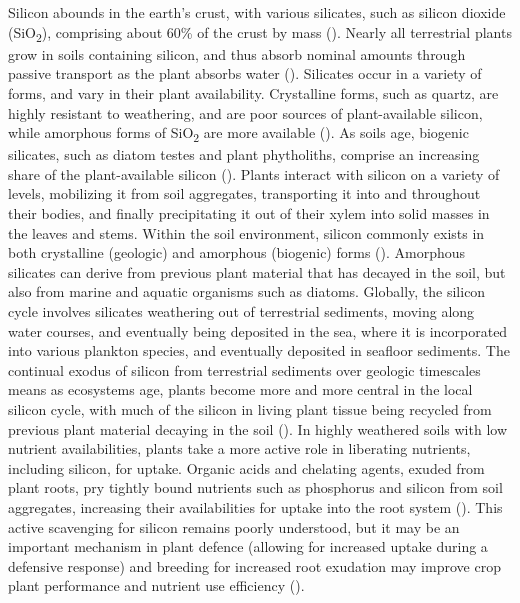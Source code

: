 \documentclass[12pt, letterpaper, ]{report}
\begin{document}
Silicon abounds in the earth’s crust, with various silicates, such as silicon dioxide (SiO\textsubscript{2}), comprising about 60\% of the crust by mass (\cite{holland_41_2014}). Nearly all terrestrial plants grow in soils containing silicon, and thus absorb nominal amounts through passive transport as the plant absorbs water (\cite{debona_silicons_2017}). Silicates occur in a variety of forms, and vary in their plant availability. Crystalline forms, such as quartz, are highly resistant to weathering, and are poor sources of plant-available silicon, while amorphous forms of SiO\textsubscript{2} are more available (\cite{fraysse_surface_2009}). As soils age, biogenic silicates, such as diatom testes and plant phytholiths, comprise an increasing share of the plant-available silicon (\cite{de_tombeur_plants_2020}). 
Plants interact with silicon on a variety of levels, mobilizing it from soil aggregates, transporting it into and throughout their bodies, and finally precipitating it out of their xylem into solid masses in the leaves and stems. Within the soil environment, silicon commonly exists in both crystalline (geologic) and amorphous (biogenic) forms (\cite{haynes_contemporary_2014}). Amorphous silicates can derive from previous plant material that has decayed in the soil, but also from marine and aquatic organisms such as diatoms. Globally, the silicon cycle involves silicates weathering out of terrestrial sediments, moving along water courses, and eventually being deposited in the sea, where it is incorporated into various plankton species, and eventually deposited in seafloor sediments. The continual exodus of silicon from terrestrial sediments over geologic timescales means as ecosystems age, plants become more and more central in the local silicon cycle, with much of the silicon in living plant tissue being recycled from previous plant material decaying in the soil (\cite{de_tombeur_plants_2020}).  In highly weathered soils with low nutrient availabilities, plants take a more active role in liberating nutrients, including silicon, for uptake. Organic acids and chelating agents, exuded from plant roots, pry tightly bound nutrients such as phosphorus and silicon from soil aggregates, increasing their availabilities for uptake into the root system (\cite{de_tombeur_silicon_2021-1}). This active scavenging for silicon remains poorly understood, but it may be an important mechanism in plant defence (allowing for increased uptake during a defensive response) and breeding for increased root exudation may improve crop plant performance and nutrient use efficiency (\cite{de_tombeur_silicon_2021}). 
\end{document}

